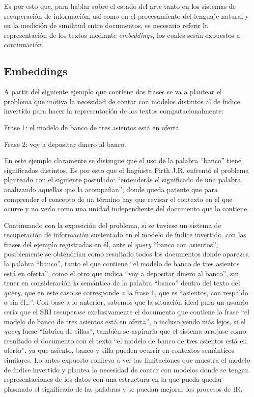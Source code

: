 \documentclass[
  12pt,
  openany]{book}
\begin{document}
Es por esto que, para hablar sobre el estado del arte tanto en los sistemas de recuperación de información, así como en el procesamiento del lenguaje natural y en la medición de similitud entre documentos, es necesario referir la representación de los textos mediante \emph{embeddings,} los cuales serán expuestos a continuación.

\hypertarget{embed}{%
\subsection{Embeddings}\label{embed}}

A partir del siguiente ejemplo que contiene dos frases se va a plantear el problema que motiva la necesidad de contar con modelos distintos al de índice invertido para hacer la representación de los textos computacionalmente:

Frase 1: el modelo de banco de tres asientos está en oferta.

Frase 2: voy a depositar dinero al banco.

En este ejemplo claramente se distingue que el uso de la palabra ``banco'' tiene significados distintos. Es por esto que el lingüista Firth J.R. enfrentó el problema planteado con el siguiente postulado: ``entenderás el significado de una palabra analizando aquellas que la acompañan'', donde queda patente que para comprender el concepto de un término hay que revisar el contexto en el que ocurre y no verlo como una unidad independiente del documento que lo contiene.

Continuando con la exposición del problema, si se tuviese un sistema de recuperación de información sustentado en el modelo de índice invertido, con las frases del ejemplo registradas en él, ante el \emph{query} ``banco con asientos'', posiblemente se obtendrían como resultado todos los documentos donde aparezca la palabra ``banco'', tanto el que contiene ``el modelo de banco de tres asientos está en oferta'', como el otro que indica ``voy a depositar dinero al banco'', sin tener en consideración la semántica de la palabra ``banco'' dentro del texto del \emph{query,} que en este caso se corresponde a la frase 1, que es ``asientos, con respaldo o sin él\ldots{}''. Con base a lo anterior, sabemos que la situación ideal para un usuario sería que el SRI recuperase exclusivamente el documento que contiene la frase ``el modelo de banco de tres asientos está en oferta'', o incluso yendo más lejos, si el \emph{query} fuese ``fábrica de sillas'', también se aspiraría que el sistema arrojase como resultado el documento con el texto ``el modelo de banco de tres asientos está en oferta'', ya que asiento, banco y silla pueden ocurrir en contextos semánticos similares. Lo antes expuesto conlleva a ver las limitaciones que muestra el modelo de índice invertido y plantea la necesidad de contar con modelos donde se tengan representaciones de los datos con una estructura en la que pueda quedar plasmado el significado de las palabras y se puedan mejorar los procesos de IR.
\end{document}
